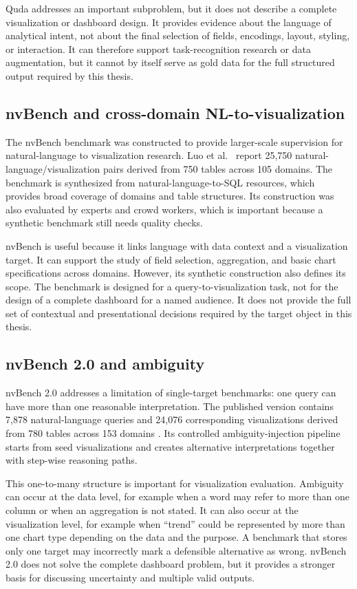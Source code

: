 Quda addresses an important subproblem, but it does not describe a complete visualization or dashboard design. It provides evidence about the language of analytical intent, not about the final selection of fields, encodings, layout, styling, or interaction. It can therefore support task-recognition research or data augmentation, but it cannot by itself serve as gold data for the full structured output required by this thesis.

\subsection{nvBench and cross-domain NL-to-visualization}

The nvBench benchmark was constructed to provide larger-scale supervision for natural-language to visualization research. Luo et al.~\cite{luo2021nvbenchsigmod} report 25,750 natural-language/visualization pairs derived from 750 tables across 105 domains. The benchmark is synthesized from natural-language-to-SQL resources, which provides broad coverage of domains and table structures. Its construction was also evaluated by experts and crowd workers, which is important because a synthetic benchmark still needs quality checks.

nvBench is useful because it links language with data context and a visualization target. It can support the study of field selection, aggregation, and basic chart specifications across domains. However, its synthetic construction also defines its scope. The benchmark is designed for a query-to-visualization task, not for the design of a complete dashboard for a named audience. It does not provide the full set of contextual and presentational decisions required by the target object in this thesis.

\subsection{nvBench 2.0 and ambiguity}

nvBench 2.0 addresses a limitation of single-target benchmarks: one query can have more than one reasonable interpretation. The published version contains 7,878 natural-language queries and 24,076 corresponding visualizations derived from 780 tables across 153 domains \cite{luo2025nvbench2}. Its controlled ambiguity-injection pipeline starts from seed visualizations and creates alternative interpretations together with step-wise reasoning paths.

This one-to-many structure is important for visualization evaluation. Ambiguity can occur at the data level, for example when a word may refer to more than one column or when an aggregation is not stated. It can also occur at the visualization level, for example when ``trend'' could be represented by more than one chart type depending on the data and the purpose. A benchmark that stores only one target may incorrectly mark a defensible alternative as wrong. nvBench 2.0 does not solve the complete dashboard problem, but it provides a stronger basis for discussing uncertainty and multiple valid outputs.

